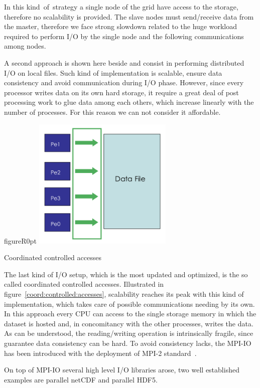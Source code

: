 In this kind~of~strategy a single node of the grid have access to the storage, therefore no scalability is provided.
The slave nodes must send/receive data from the master, therefore we face strong slowdown related to the huge workload required to perform I/O by the single node and the following communications among nodes.\par
A second approach is shown here beside and consist in performing distributed I/O on local files. Such kind of implementation is scalable, ensure data consistency and avoid communication during I/O phase. 
However, since every processor writes data on its own hard storage, it require a great deal of post processing work to glue data among each others, which increase linearly with the number of processes. For this reason we can not consider it affordable. \\
\begin{wrapfloat}{figure}{R}{0pt}
\includegraphics[width=0.5\textwidth]{grafici/mpiio}
\caption{Coordinated controlled accesses}
\end{wrapfloat}
\label{coord:controlled:accesses}
\par
The last kind of I/O setup, which is the most updated and optimized, is the so called coordinated controlled accesses.
Illustrated in figure~\ref{coord:controlled:accesses}, scalability reaches its peak with this kind of implementation, which takes care of possible communications needing by its own.
In this approach every CPU can access to the single storage memory in which the dataset is hosted and, in concomitancy with the other processes, writes the data. As can be understood, the reading/writing operation is intrinsically fragile, since guarantee data consistency can be hard. To avoid consistency lacks, the MPI-IO has been introduced with the deployment of MPI-2 standard~\cite{MPI:standard2}.

On top of MPI-IO several high level I/O libraries arose, two well established examples are parallel netCDF and parallel HDF5. 

